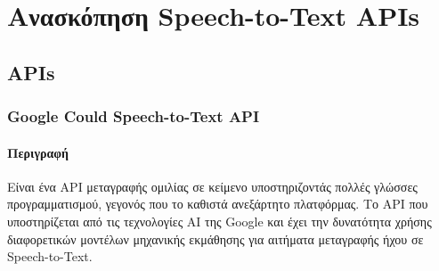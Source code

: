 \documentclass[oneside, 12pt]{book}
\begin{document}
\chapter{Ανασκόπηση Speech-to-Text APIs}
\label{ch:ανασκόπηση-speech-to-text-apis}
\section{APIs}
\label{sec:apis}
\subsection{Google Could Speech-to-Text API}
\label{subsec:google-speech-to-text}
\subsubsection{Περιγραφή}
Είναι ένα API μεταγραφής ομιλίας σε κείμενο υποστηριζοντάς πολλές γλώσσες προγραμματισμού, γεγονός
που το καθιστά ανεξάρτητο πλατφόρμας.
Το API που υποστηρίζεται από τις τεχνολογίες AI της Google και έχει την δυνατότητα χρήσης
διαφορετικών μοντέλων μηχανικής εκμάθησης για αιτήματα μεταγραφής ήχου σε Speech-to-Text.
\end{document}
